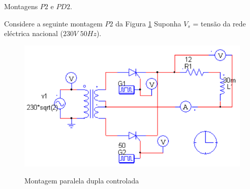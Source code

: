 \documentclass[titlepage, a4paper, 11pt, reqno, openany]{article}%
\begin{document}
\pagestyle{plain}%
\tableofcontents
\newpage
{\huge Montagens $P2$ e $PD2$.}\par
%
\begin{flushleft}
Considere a seguinte montagem $P2$ da Figura \ref{grafico 1} Suponha $V_s$ = tens\~{a}o da rede el\'{e}ctrica nacional ($230V\,\, 50Hz$).\par
\end{flushleft}
%

%
\begin{figure}[H]
\centering
\includegraphics[width=0.75\linewidth]{./image/P3A1.png}\\
\caption{Montagem paralela dupla controlada}
\label{grafico 1}
\end{figure}\par
\end{document}
